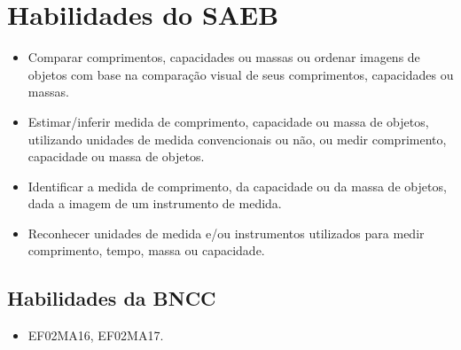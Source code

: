 
\vspace*{-1cm}

\section*{Habilidades do SAEB}

\begin{itemize}
\item Comparar comprimentos, capacidades ou massas ou ordenar imagens de
  objetos com base na comparação visual de seus comprimentos, capacidades ou massas.

\item Estimar/inferir medida de comprimento, capacidade ou massa de objetos,
  utilizando unidades de medida convencionais ou não, ou medir
  comprimento, capacidade ou massa de objetos.

\item Identificar a medida de comprimento, da capacidade ou da massa de
  objetos, dada a imagem de um instrumento de medida.

\item Reconhecer unidades de medida e/ou instrumentos utilizados para medir
  comprimento, tempo, massa ou capacidade.
\end{itemize}

\subsection{Habilidades da BNCC}

\begin{itemize}
\item EF02MA16, EF02MA17.
\end{itemize}

